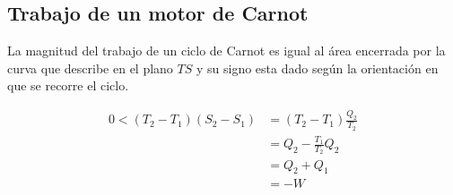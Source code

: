 \subsection{Trabajo de un motor de Carnot}
\label{TCarnot}
La magnitud del trabajo de un ciclo de Carnot es igual al área encerrada por la curva que describe en el plano $TS$ y su signo esta dado según la orientación en que se recorre el ciclo.

\begin{equation}
\begin{split}
    0<(T_2-T_1)(S_2-S_1) &= (T_2-T_1)\frac{Q_2}{T_2}\\
    &=Q_2-\frac{T_1}{T_2}Q_2\\
    &=Q_2+Q_1\\
    &=-W\\
\end{split}
\nonumber
\end{equation}

\newpage